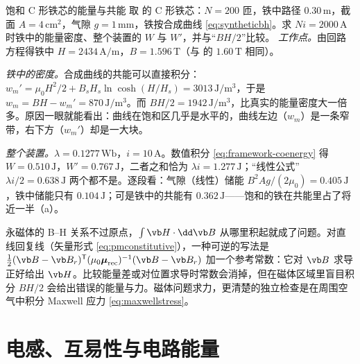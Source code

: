 \begin{example}[label=ex:framework-coenergy]{饱和 C 形铁芯的能量与共能}
取 的 C 形铁芯：$N=200$ 匝，铁中路径 $0.30\,\mathrm m$，截面 $A=4\,\mathrm{cm^2}$，气隙 $g=1\,\mathrm{mm}$，铁按合成曲线 \eqref{eq:syntheticbh}。求 $Ni=2000\,\mathrm A$ 时铁中的能量密度、整个装置的 $W$ 与 $W'$，并与“$BH/2$”比较。
\solution
\emph{工作点。}由回路方程得铁中 $H=2434\,\mathrm{A/m}$，$B=1.596\,\mathrm T$（与 的 $1.60\,\mathrm T$ 相同）。

\emph{铁中的密度。}合成曲线的共能可以直接积分：$w_m'=\mu_0H^2/2+B_sH_s\ln\cosh(H/H_s)=3013\,\mathrm{J/m^3}$，于是 $w_m=BH-w_m'=870\,\mathrm{J/m^3}$。而 $BH/2=1942\,\mathrm{J/m^3}$，比真实的能量密度大一倍多。原因一眼就能看出：曲线在饱和区几乎是水平的，曲线左边（$w_m$）是一条窄带，右下方（$w_m'$）却是一大块。

\emph{整个装置。}$\lambda=0.1277\,\mathrm{Wb}$，$i=10\,\mathrm A$。数值积分 \eqref{eq:framework-coenergy} 得 $W=0.510\,\mathrm J$，$W'=0.767\,\mathrm J$，二者之和恰为 $\lambda i=1.277\,\mathrm J$；“线性公式” $\lambda i/2=0.638\,\mathrm J$ 两个都不是。逐段看：气隙（线性）储能 $B^2Ag/(2\mu_0)=0.405\,\mathrm J$，铁中储能只有 $0.104\,\mathrm J$；可是铁中的共能有 $0.362\,\mathrm J$——饱和的铁在共能里占了将近一半（a）。
\end{example}

\begin{deeper}[永磁体的能量要选参考状态]
永磁体的 B--H 关系不过原点，$\int\vb H\cdot\dd\vb B$ 从哪里积起就成了问题。对直线回复线（矢量形式 \eqref{eq:pmconstitutive}），一种可逆的写法是 $\tfrac12(\vb B-\vb B_r)^{\mathsf T}(\mu_0\boldsymbol\mu_{\rm rec})^{-1}(\vb B-\vb B_r)$ 加一个参考常数：它对 $\vb B$ 求导正好给出 $\vb H$。比较能量差或对位置求导时常数会消掉，但在磁体区域里盲目积分 $BH/2$ 会给出错误的能量与力。磁体问题求力，更清楚的独立检查是在周围空气中积分 Maxwell 应力 \eqref{eq:maxwellstress}。
\end{deeper}

\section{电感、互易性与电路能量}\label{sec:framework-inductance}

